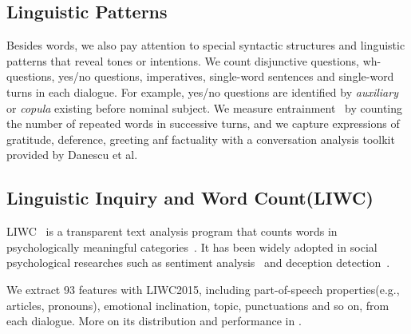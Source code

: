 \subsection{Linguistic Patterns}
Besides words, we also pay attention to special syntactic structures 
and linguistic patterns that reveal tones or intentions. 
We count disjunctive questions, wh-questions, 
yes/no questions, imperatives, single-word sentences and 
single-word turns in each dialogue. 
For example, yes/no questions are identified by \textit{auxiliary} or 
\textit{copula} existing before nominal subject. 
We measure entrainment~\cite{entrainment} by counting the number of
repeated words in successive turns, 
and we capture expressions of gratitude, deference, greeting anf factuality with a conversation analysis toolkit provided by Danescu et al.~\cite{politeness} 



\subsection{Linguistic Inquiry and Word Count(LIWC)}
LIWC~\cite{liwc} is a transparent text analysis program that counts words in psychologically 
meaningful categories~\cite{liwc2}. It has been widely adopted in social psychological researches 
such as sentiment analysis~\cite{sentiment} and deception detection~\cite{deception}.

We extract 93 features with LIWC2015, including part-of-speech properties(e.g., articles, pronouns), 
emotional inclination, topic, punctuations and so on, from each dialogue. More on its distribution and performance in .
